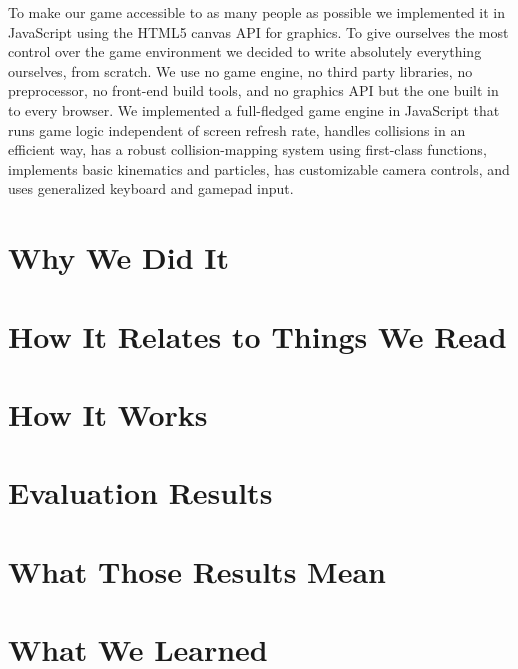 \documentclass[a4paper, 12pt]{article}
\begin{document}
To make our game accessible to as many people as possible we implemented it in
JavaScript using the HTML5 canvas API for graphics. To give ourselves the most
control over the game environment we decided to write absolutely everything
ourselves, from scratch. We use no game engine, no third party libraries, no
preprocessor, no front-end build tools, and no graphics API but the one built in
to every browser. We implemented a full-fledged game engine in JavaScript that
runs game logic independent of screen refresh rate, handles collisions in an
efficient way, has a robust collision-mapping system using first-class
functions, implements basic kinematics and particles, has customizable camera
controls, and uses generalized keyboard and gamepad input.

\section{Why We Did It}


\section{How It Relates to Things We Read}


\section{How It Works}



\section{Evaluation Results}



\section{What Those Results Mean}



\section{What We Learned}

\end{document}
